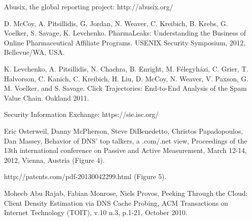 \documentclass[11pt,a4paper]{article}
\begin{document}
\begin{thebibliography}{1}
 Abusix, the global reporting project: http://abusix.org/

 D. McCoy, A. Pitsillidis, G. Jordan, N. Weaver, C. Kreibich, B. Krebs, G. Voelker, S. Savage, K. Levchenko. PharmaLeaks: Understanding the Business of Online Pharmaceutical Affiliate Programs. USENIX Security Symposium, 2012, Bellevue/WA, USA. 

 K. Levchenko, A. Pitsillidis, N. Chachra, B. Enright, M. Félegyházi, C. Grier, T. Halvorson, C. Kanich, C. Kreibich, H. Liu, D. McCoy, N. Weaver, V. Paxson, G. M. Voelker, and S. Savage. Click Trajectories: End-to-End Analysis of the Spam Value Chain. Oakland 2011.

 Security Information Exchange: https://sie.isc.org/

 Eric Osterweil, Danny McPherson, Steve DiBenedetto, Christos Papadopoulos, Dan Massey, Behavior of DNS' top talkers, a .com/.net view, Proceedings of the 13th international conference on Passive and Active Measurement, March 12-14, 2012, Vienna, Austria (Figure 4).

 http://patents.com/pdf-20130042299.html (Figure 5).

 Moheeb Abu Rajab, Fabian Monrose, Niels Provos, Peeking Through the Cloud: Client Density Estimation via DNS Cache Probing, ACM Transactions on Internet Technology (TOIT), v.10 n.3, p.1-21, October 2010.


\end{thebibliography}
\end{document}
